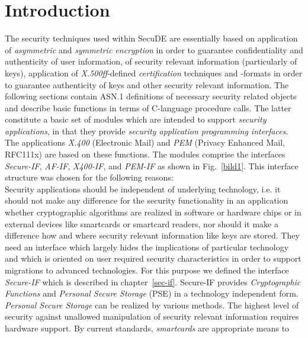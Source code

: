 \section{Introduction}
\label{if}
\thispagestyle{myheadings}

The security techniques used within SecuDE are essentially based on
\be
\m application of {\em asymmetric} and {\em symmetric encryption} in order to guarantee
   confidentiality and authenticity of user information,
 of security relevant information (particularly of keys),
\m application of {\em X.500ff}-defined {\em certification} techniques and -formats in order to
   guarantee authenticity of keys and other security relevant information.
\ee
The following sections 
contain ASN.1 definitions of necessary security related objects and
describe basic functions in terms of C-language procedure calls. 
The latter constitute a basic set of modules
which are intended to support {\em security applications},
in that they provide {\em security application programming interfaces}.
The applications {\em X.400} (Electronic Mail) and {\em PEM} (Privacy Enhanced Mail, RFC111x)
are based on these functions. The modules comprise the interfaces {\em Secure-IF},
{\em AF-IF}, {\em X400-IF}, and {\em PEM-IF} as shown in Fig.~\ref{bild1}. 
This interface structure was chosen for the following reasons: \\ [1ex]
Security applications should be independent of underlying technology, i.e. it should
not make any difference for the security functionality in an application whether 
cryptographic algorithms are realized
in software or hardware chips or in external devices like smartcards or smartcard readers,
nor should it make a difference how and where security relevant information like keys 
are stored. They need an interface which largely hides the implications of particular
technology and which is oriented on user required security characteristics
in order to support migrations to advanced technologies. For this purpose
we defined the interface {\em Secure-IF} which is described in chapter~\ref{sec-if}. 
Secure-IF provides {\em Cryptographic Functions} 
and {\em Personal Secure Storage} (PSE) in a technology independent form. \\ [1ex]
{\em Personal Secure Storage} can be realized by various methods. The highest level of
security against unallowed manipulation of security relevant information requires
hardware support. By current standards, {\em smartcards} are appropriate means to
